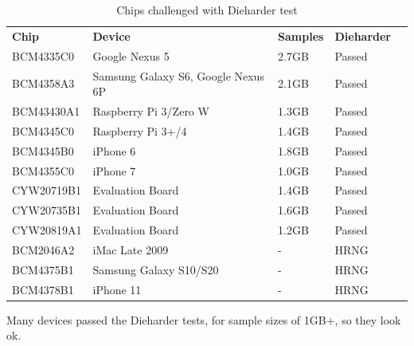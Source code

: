 \begin{table}[htb]
    \caption{Chips challenged with Dieharder test}	
    \begin{adjustbox}{width=\textwidth}
        \begin{tabular}{|l|l|l|l|l}
            \cline{1-4}
            \textbf{Chip} & \textbf{Device}                      & \textbf{Samples} & \textbf{Dieharder} &  \\ \cline{1-4}
            BCM4335C0     & Google   Nexus 5                     & 2.7GB            & Passed             &  \\ \cline{1-4}
            BCM4358A3     & Samsung   Galaxy S6, Google Nexus 6P & 2.1GB            & Passed             &  \\ \cline{1-4}
            BCM43430A1    & Raspberry   Pi 3/Zero W              & 1.3GB            & Passed             &  \\ \cline{1-4}
            BCM4345C0     & Raspberry   Pi 3+/4                  & 1.4GB            & Passed             &  \\ \cline{1-4}
            BCM4345B0     & iPhone 6                             & 1.8GB            & Passed             &  \\ \cline{1-4}
            BCM4355C0     & iPhone 7                             & 1.0GB            & Passed             &  \\ \cline{1-4}
            CYW20719B1    & Evaluation   Board                   & 1.4GB            & Passed             &  \\ \cline{1-4}
            CYW20735B1    & Evaluation   Board                   & 1.6GB            & Passed             &  \\ \cline{1-4}
            CYW20819A1    & Evaluation   Board                   & 1.2GB            & Passed             &  \\ \cline{1-4}
            BCM2046A2     & iMac Late   2009                     & -                & HRNG               &  \\ \cline{1-4}
            BCM4375B1     & Samsung   Galaxy S10/S20             & -                & HRNG               &  \\ \cline{1-4}
            BCM4378B1     & iPhone 11                            & -                & HRNG               &  \\ \cline{1-4}
        \end{tabular}
    \end{adjustbox}
    \end{table}
    \break
    Many devices passed the Dieharder tests, for sample sizes of 1GB+, so they look ok.
    
